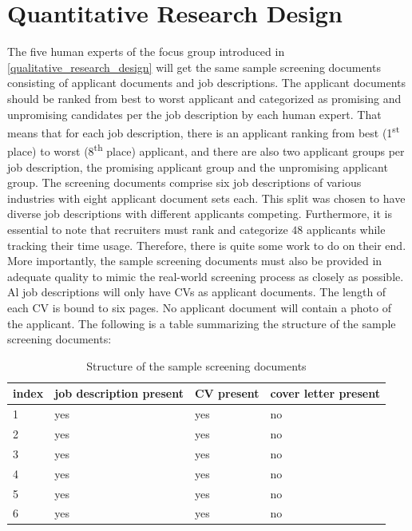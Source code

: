 \documentclass[draft,final]{thesisclass} %
\begin{document}
\section{Quantitative Research Design} \label{quantitative_research_design}
The five human experts of the focus group introduced in \ref{qualitative_research_design} will get the same sample screening documents consisting of applicant documents and job descriptions.
The applicant documents should be ranked from best to worst applicant and categorized as promising and unpromising candidates per the job description by each human expert.
That means that for each job description, there is an applicant ranking from best (1\textsuperscript{st} place) to worst (8\textsuperscript{th} place) applicant, and there are also two applicant groups per job description, the promising applicant group and the unpromising applicant group.
The screening documents comprise six job descriptions of various industries with eight applicant document sets each.
This split was chosen to have diverse job descriptions with different applicants competing.
Furthermore, it is essential to note that recruiters must rank and categorize $48$ applicants while tracking their time usage. Therefore, there is quite some work to do on their end.
More importantly, the sample screening documents must also be provided in adequate quality to mimic the real-world screening process as closely as possible.
Al job descriptions will only have \acs{CV}s as applicant documents.
The length of each \acs{CV} is bound to six pages.
No applicant document will contain a photo of the applicant.
The following is a table summarizing the structure of the sample screening documents:
\begin{table}[H]
    \begin{tabular}{|l|l|l|l|}
    \hline
    \textbf{index} & \textbf{job description present} & \textbf{\acs{CV} present} & \textbf{cover letter present} \\ \hline
    1 & yes & yes & no \\ \hline
    2 & yes & yes & no \\ \hline
    3 & yes & yes & no \\ \hline
    4 & yes & yes & no \\ \hline
    5 & yes & yes & no \\ \hline
    6 & yes & yes & no \\ \hline
    \end{tabular}
    \caption{Structure of the sample screening documents}
\end{table}
\end{document}
